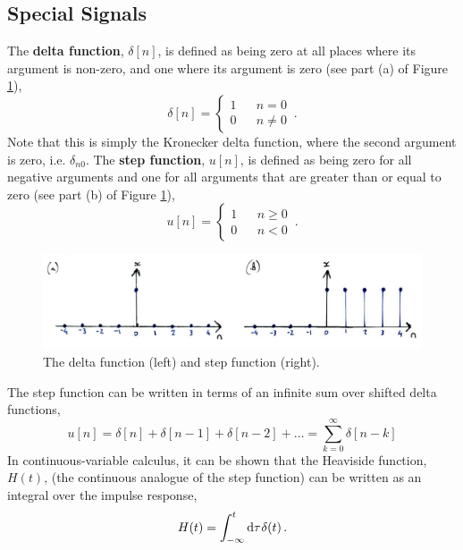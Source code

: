 \subsection{Special Signals}
%
The \textbf{delta function}, $\delta[n]$, is defined as being zero at all places where its argument
is non-zero, and one where its argument is zero (see part (a) of Figure \ref{fig::lecture_1_delta_and_step}),
%
\begin{equation}
  \delta[n] = \left\{\begin{array}{ccl}
    1 & & n = 0 \\
    0 & & n \neq 0
  \end{array}\right. \,.
\end{equation}
%
Note that this is simply the Kronecker delta function, where the second argument is zero, i.e. $\delta_{n0}$.
The \textbf{step function}, $u[n]$, is defined as being zero for all negative arguments and one for
all arguments that are greater than or equal to zero (see part (b) of Figure
\ref{fig::lecture_1_delta_and_step}),
%
\begin{equation}
  u[n] = \left\{\begin{array}{ccl}
    1 & & n \geq 0 \\
    0 & & n < 0
  \end{array}\right. \,.
\end{equation}
%
\begin{figure}[H]
  \includegraphics[width=\textwidth]{images/lecture_1_delta_and_step.JPG}
  \caption{
    The delta function (left) and step function (right).
  }
  \label{fig::lecture_1_delta_and_step}
\end{figure}
%
The step function can be written in terms of an infinite sum over shifted delta functions,
%
\begin{equation}
  u[n] = \delta[n] + \delta[n-1] + \delta[n-2] + \hdots = \sum_{k=0}^\infty \delta[n-k]
\end{equation}
%
In continuous-variable calculus, it can be shown that the Heaviside function, $H(t)$, (the continuous
analogue of the step function) can be written as an integral over the impulse response,
%
\begin{displaymath}
  H(t) = \int^t_{-\infty} \mathrm{d}\tau\mkern1mu\delta(t) \,.
\end{displaymath}
